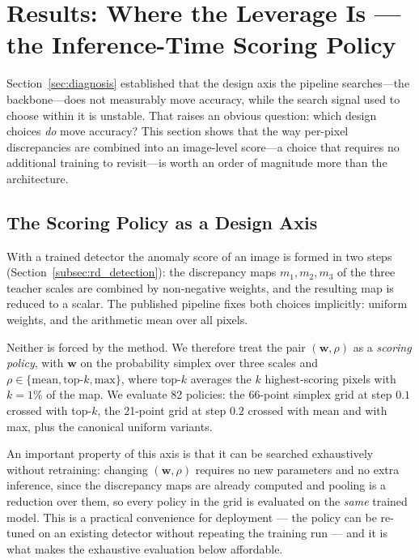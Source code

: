 
\section{Results: Where the Leverage Is --- the Inference-Time Scoring Policy}
\label{sec:leverage}

Section~\ref{sec:diagnosis} established that the design axis the pipeline
searches---the backbone---does not measurably move accuracy, while the search
signal used to choose within it is unstable. That raises an obvious question:
which design choices \emph{do} move accuracy? This section shows that the way
per-pixel discrepancies are combined into an image-level score---a choice that
requires no additional training to revisit---is worth an order of magnitude more
than the architecture.

\subsection{The Scoring Policy as a Design Axis}
\label{subsec:policy_space}

With a trained detector the anomaly score of an image is formed in two steps
(Section~\ref{subsec:rd_detection}): the discrepancy maps $m_1, m_2, m_3$ of the
three teacher scales are combined by non-negative weights, and the resulting map
is reduced to a scalar. The published pipeline fixes both choices implicitly:
uniform weights, and the arithmetic mean over all pixels.

Neither is forced by the method. We therefore treat the pair
$(\mathbf{w}, \rho)$ as a \emph{scoring policy}, with
$\mathbf{w}$ on the probability simplex over three scales and
$\rho \in \{\text{mean}, \text{top-}k, \text{max}\}$, where top-$k$ averages the
$k$ highest-scoring pixels with $k = 1\%$ of the map. We evaluate 82 policies:
the 66-point simplex grid at step $0.1$ crossed with top-$k$, the 21-point grid
at step $0.2$ crossed with mean and with max, plus the canonical uniform
variants.

An important property of this axis is that it can be searched exhaustively
without retraining: changing $(\mathbf{w},\rho)$ requires no new parameters and no
extra inference, since the discrepancy maps are already computed and pooling is a
reduction over them, so every policy in the grid is evaluated on the \emph{same}
trained model. This is a practical convenience for deployment --- the policy can be
re-tuned on an existing detector without repeating the training run --- and it is
what makes the exhaustive evaluation below affordable.

